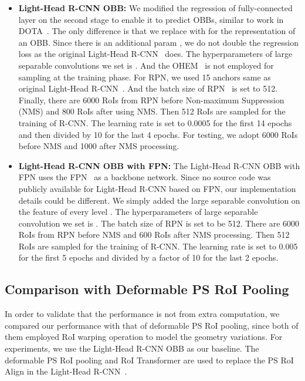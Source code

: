 \documentclass[11pt,onecolumn]{article}         \usepackage[top=3.6cm, bottom=3.2cm, left=2.3cm, right=2.3cm]{geometry}
\begin{document}
\begin{itemize}
    \item \textbf{Light-Head R-CNN OBB: }We modified the regression of fully-connected layer on the second stage to enable it to predict OBBs, similar to work in DOTA~\cite{DOTA}. The only difference is that we replace  with  for the representation of an OBB.
Since there is an additional param , we do not double the regression loss as the original Light-Head R-CNN~\cite{light_head} does. 
The hyperparameters of large separable convolutions we set is . 
And the OHEM~\cite{ohem} is not employed for sampling at the training phase. For RPN, we used 15 anchors same as original Light-Head R-CNN~\cite{light_head}. And the batch size of RPN~\cite{FasterR-CNN} is set to 512. Finally, there are 6000 RoIs from RPN before Non-maximum Suppression (NMS) and 800 RoIs after using NMS. Then 512 RoIs are sampled for the training of R-CNN.
    The learning rate is set to 0.0005 for the first 14 epochs and then divided by 10 for the last 4 epochs. 
For testing, we adopt 6000 RoIs before NMS and 1000 after NMS processing.
    \item \textbf{Light-Head R-CNN OBB with FPN: }The Light-Head R-CNN OBB with FPN uses the FPN~\cite{FPN} as a backbone network. Since no source code was publicly available for Light-Head R-CNN based on FPN, our implementation details could be different. We simply added the large separable convolution on the feature of every level . The hyperparameters of large separable convolution we set is . 
    The batch size of RPN is set to be 512. There are 6000 RoIs from RPN before NMS and 600 RoIs after NMS processing. Then 512 RoIs are sampled for the training of R-CNN.
    The learning rate is set to 0.005 for the first 5 epochs and divided by a factor of 10 for the last 2 epochs.
\end{itemize}

\subsection{Comparison with Deformable PS RoI Pooling}
In order to validate that the performance is not from extra computation, we compared our performance with that of deformable PS RoI pooling, since both of them employed RoI warping operation to model the geometry variations. For experiments, we use the Light-Head R-CNN OBB as our baseline. The deformable PS RoI pooling and RoI Transformer are used to replace the PS RoI Align in the Light-Head R-CNN~\cite{light_head}.
\end{document}
